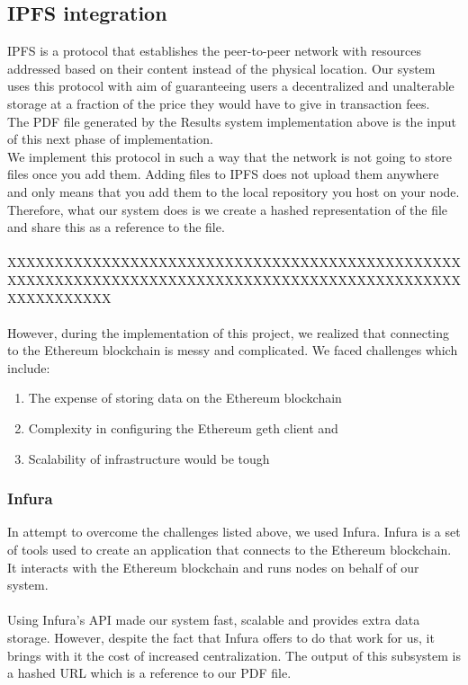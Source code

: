 \subsection{IPFS integration}
IPFS is a protocol that establishes the peer-to-peer network with resources addressed based on their content instead of the physical location. Our system uses this protocol with aim of guaranteeing users a decentralized and unalterable storage at a fraction of the price they  would have to give in transaction fees.\\
The PDF file generated by the Results system implementation above is the input of this next phase of implementation.\\
We implement this protocol in such a way that the network is not going to store files once you add them. Adding files to IPFS does not upload them anywhere and only means that you add them to the local repository you host on your node. Therefore, what our system does is we create a hashed representation of the file and share this as a reference to the file.\\\\
XXXXXXXXXXXXXXXXXXXXXXXXXXXXXXXXXXXXXXXXXXXXXXXXXXXXXXXXXXXXXXXXXXXXXXXXXXXXXXXXXXXXXXXXXXXXXXXXXXXXXXXXXXX
\\\\
However, during the implementation of this project, we realized that connecting to the Ethereum blockchain is messy and complicated. We faced challenges which include:
\begin{enumerate}
\item The expense of storing data on the Ethereum blockchain
\item Complexity in configuring the Ethereum geth client and
\item Scalability of infrastructure would be tough
\end{enumerate}
\subsubsection{Infura}
In attempt to overcome the challenges listed above, we used Infura. Infura is a set of tools used to create an application that connects to the Ethereum blockchain. It interacts with the Ethereum blockchain and runs nodes on behalf of our system.\\\\
Using Infura's API made our system fast, scalable and provides extra data storage. However, despite the fact that Infura offers to do that work for us, it brings with it the cost of increased centralization.
The output of this subsystem is a hashed  URL which is a reference to our PDF file.

